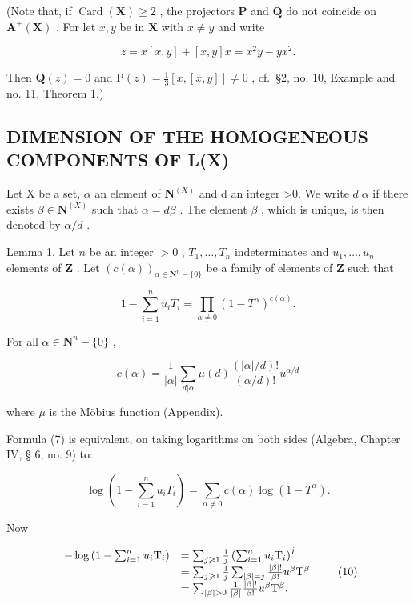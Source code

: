 (Note that, if \(\operatorname{Card}(\mathbf{X}) \geqslant 2\) , the projectors \(\mathbf{P}\) and \(\mathbf{Q}\) do not coincide on \(\mathbf{A}^{+}(\mathbf{X})\) . For let \(x, y\) be in \(\mathbf{X}\) with \(x \neq y\) and write

\[
z = x [ x, y ] + [ x, y ] x = x ^ {2} y - y x ^ {2}.
\]

Then \(\mathbf{Q}(z) = 0\) and \(\mathrm{P}(z) = \frac{1}{3}[x, [x,y]] \neq 0\) , cf.~§2, no. 10, Example and no. 11, Theorem 1.)

\subsection{DIMENSION OF THE HOMOGENEOUS COMPONENTS OF L(X)}

Let X be a set, \(\alpha\) an element of \(\mathbf{N}^{(X)}\) and d an integer >0. We write \(d|\alpha\) if there exists \(\beta\in\mathbf{N}^{(X)}\) such that \(\alpha=d\beta\) . The element \(\beta\) , which is unique, is then denoted by \(\alpha/d\) .

Lemma 1. Let \(n\) be an integer \(>0\) , \(T_1, \ldots, T_n\) indeterminates and \(u_1, \ldots, u_n\) elements of \(\mathbf{Z}\) . Let \((c(\alpha))_{\alpha \in \mathbf{N}^n - \{0\}}\) be a family of elements of \(\mathbf{Z}\) such that

\[
1 - \sum_ {i = 1} ^ {n} u _ {i} T _ {i} = \prod_ {\alpha \neq 0} (1 - T ^ {\alpha}) ^ {c (\alpha)}.\tag{7}
\]

For all \(\alpha \in \mathbf{N}^n - \{0\}\) ,

\[
c (\alpha) = \frac {1}{| \alpha |} \sum_ {d | \alpha} \mu (d) \frac {(| \alpha | / d) !}{(\alpha / d) !} u ^ {\alpha / d}\tag{8}
\]

where \(\mu\) is the Möbius function (Appendix).

Formula (7) is equivalent, on taking logarithms on both sides (Algebra, Chapter IV, § 6, no. 9) to:

\[
\log \left(1 - \sum_ {i = 1} ^ {n} u _ {i} T _ {i}\right) = \sum_ {\alpha \neq 0} c (\alpha) \log (1 - T ^ {\alpha}).\tag{9}
\]

Now

\[
\begin{array}{r l} - \log \left(1 - \sum_ {i = 1} ^ {n} u _ {i} \mathrm{T} _ {i}\right) & = \sum_ {j \geqslant 1} \frac {1}{j} \left(\sum_ {i = 1} ^ {n} u _ {i} \mathrm{T} _ {i}\right) ^ {j} \\ & = \sum_ {j \geqslant 1} \frac {1}{j} \sum_ {| \beta | = j} \frac {| \beta | !}{\beta !} u ^ {\beta} \mathrm{T} ^ {\beta} \\ & = \sum_ {| \beta | > 0} \frac {1}{| \beta |} \frac {| \beta | !}{\beta !} u ^ {\beta} \mathrm{T} ^ {\beta}. \end{array}\tag{10}
\]

